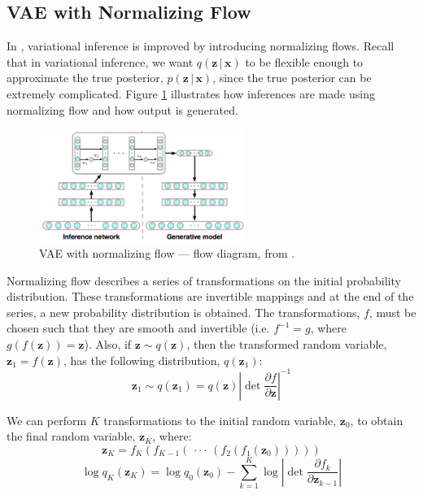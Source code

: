 \documentclass{article}
\newcommand{\bz}{\mathbf{z}}
\newcommand{\bx}{\mathbf{x}}
\newcommand{\given}{\,|\,}
\begin{document}
\subsection{VAE with Normalizing Flow}
In \citet{RM15}, variational inference is improved by introducing normalizing flows.  Recall that in
variational inference, we want $q(\bz \given \bx)$ to be flexible enough to approximate the true posterior,
$p(\bz \given \bx)$, since the true posterior can be extremely complicated. Figure \ref{fig:VAENormFlow} 
illustrates how inferences are made using normalizing flow and how output is generated.

\begin{figure}[htbp]
\hspace{1em}
\begin{center}
	\includegraphics[width=0.6\textwidth]{NormFlowDiagram.png}
\caption{VAE with normalizing flow --- flow diagram, from \cite{RM15}.}
\label{fig:VAENormFlow}
\end{center}
\vspace{-0.5em}
\end{figure}

Normalizing flow describes a series of transformations on the initial probability distribution.  These 
transformations are invertible mappings and at the end of the series, a new probability distribution is 
obtained.  The transformations, $f$, must be chosen such that they are smooth and invertible (i.e. 
$f^{-1} = g$, where $g(f(\bz)) = \bz$).  Also, if $\bz \sim q(\bz)$, then the transformed random variable, 
$\bz_1 = f(\bz)$, has the following distribution, $q(\bz_1)$:
\begin{equation}
	\bz_1 \sim q(\bz_1) = q(\bz) \left|\det\frac{\partial f}{\partial\bz}\right|^{-1}
\end{equation}

We can perform $K$ transformations to the initial random variable, $\bz_0$, to obtain the final random variable,
$\bz_K$, where:
\begin{equation}
	\bz_K = f_K(f_{K-1}( \,\cdot\cdot\cdot\, (f_2(f_1(\bz_0)))))
\end{equation}
\begin{equation} \label{eq:logqkzk}
	\log q_K(\bz_K) = \log q_0(\bz_0) - \sum_{k=1}^K \log \left|\det\frac{\partial f_k}{\partial\bz_{k-1}}\right|
\end{equation}
\end{document}
